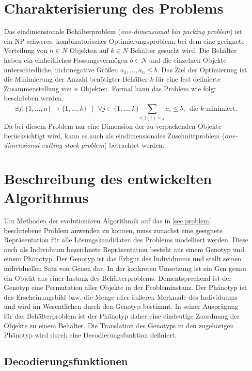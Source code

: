     \section{Charakterisierung des Problems}
    \label{sec:problem}
    Das eindimensionale Behälterproblem (\textit{one-dimensional bin packing problem}) ist ein NP-schweres, kombinatorisches Optimierungsproblem, bei dem eine geeignete Verteilung von $n \in N$ Objekten auf $k \in N$ Behälter gesucht wird. Die Behälter haben ein einheitliches Fassungsvermögen $b \in N$ und die einzelnen Objekte unterschiedliche, nichtnegative Größen $a_1, \dots ,a_n \le b$. Das Ziel der Optimierung ist die Minimierung der Anzahl benötigter Behälter $k$ für eine fest definierte Zusammenstellung von $n$ Objekten. Formal kann das Problem wie folgt beschrieben werden.
    $$\exists f: \{1,\dots,n\} \rightarrow \{1,\dots,k\} \text{ } | \text{ } \forall j \in \{1,\dots,k\} \displaystyle\sum\limits_{i:f(i) = j}^{}{a_i \le b} \text{, }  \text{ die }k\text{ minimiert.}$$
Da bei diesem Problem nur eine Dimension der zu verpackenden Objekte berücksichtigt wird, kann es auch als eindimensionales Zuschnittproblem (\textit{one-dimensional cutting stock problem}) betrachtet werden. \parencite[485]{KorteVygen:2008}
    
    \section{Beschreibung des entwickelten Algorithmus}

    Um Methoden der evolutionären Algorithmik auf das in \autoref{sec:problem} beschriebene Problem anwenden zu können, muss zunächst eine geeignete Repräsentation für alle Lösungskandidaten des Problems modelliert werden. Diese auch als Individuum bezeichnete Repräsentation besteht aus einem Genotyp und einem Phänotyp. Der Genotyp ist das Erbgut des Individuums und stellt seinen individuellen Satz von Genen dar. In der konkreten Umsetzung ist ein Gen genau ein Objekt aus einer Instanz des Behälterproblems. Dementsprechend ist der Genotyp eine Permutation aller Objekte in der Probleminstanz. Der Phänotyp ist das Erscheinungsbild bzw. die Menge aller äußeren Merkmale des Individuums und wird im Wesentlichen durch den Genotyp bestimmt. In seiner Ausprägung für das Behälterproblem ist der Phänotyp daher eine eindeutige Zuordnung der Objekte zu einem Behälter. Die Translation des Genotyps in den zugehörigen Phänotyp wird durch eine Decodierungsfunktion definiert. 
    
    \subsection{Decodierungsfunktionen}
    
